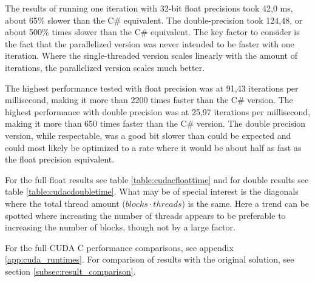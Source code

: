 The results of running one iteration with 32-bit float precisions took 42,0 ms, about 65\% slower than the C\# equivalent.
The double-precision took 124,48, or about 500\% times slower than the C\# equivalent.
The key factor to consider is the fact that the parallelized version was never intended to be faster with one iteration.
Where the single-threaded version scales linearly with the amount of iterations, the parallelized version scales much better.

The highest performance tested with float precision was at 91,43 iterations per millisecond, making it more than 2200 times faster than the C\# version.
The highest performance with double precision was at 25,97 iterations per millisecond, making it more than 650 times faster than the C\# version.
The double precision version, while respectable, was a good bit slower than could be expected and could most likely be optimized to a rate where it would be about half as fast as the float precision equivalent.

For the full float results see table \ref{table:cudacfloattime} and for double results see table \ref{table:cudacdoubletime}.
What may be of special interest is the diagonals where the total thread amount ($blocks \cdot threads$) is the same.
Here a trend can be spotted where increasing the number of threads appears to be preferable to increasing the number of blocks, though not by a large factor.

For the full CUDA C performance comparisons, see appendix \ref{app:cuda_runtimes}.
For comparison of results with the original solution, see section \ref{subsec:result_comparison}.


\begin{table}[h!]
\centering
{}
\caption{CUDA C calculations per ms with float precision\label{table:cudacfloattime}}
\end{table}


